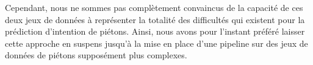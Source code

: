Cependant, nous ne sommes pas complètement convaincus de la capacité de ces deux jeux de données à représenter la totalité des difficultés qui existent pour la prédiction d'intention de piétons. Ainsi, nous avons pour l'instant préféré laisser cette approche en suspens jusqu'à la mise en place d'une pipeline sur des jeux de données de piétons supposément plus complexes.
